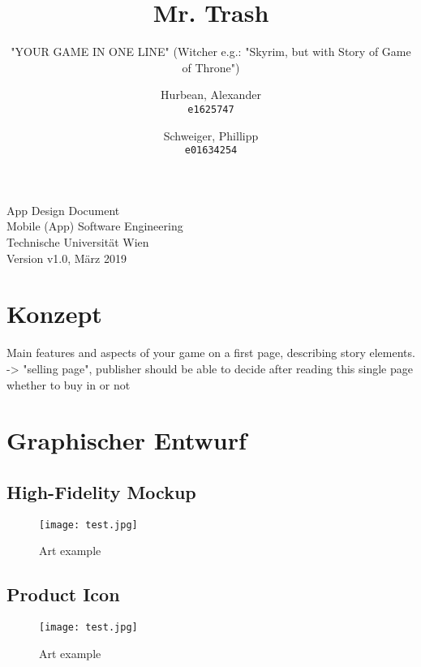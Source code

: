 \documentclass[a4paper]{scrreprt}
\title{Mr. Trash}
\subtitle{"YOUR GAME IN ONE LINE" (Witcher e.g.: "Skyrim, but with Story of Game of Throne")}
\author{
    Hurbean, Alexander\\
    \texttt{e1625747}
    \and
    Schweiger, Phillipp\\
    \texttt{e01634254}}
\begin{document}
\maketitle

\null\vfill
\noindent
App Design Document\\ 
Mobile (App) Software Engineering\\
Technische Universität Wien\\
Version v1.0, März 2019\\
\newpage


\tableofcontents

\chapter{Konzept}

Main features and aspects of your game on a first page, describing story elements. -> "selling page", publisher should be able to decide after reading this single page whether to buy in or not 


\chapter{Graphischer Entwurf} 

\section{High-Fidelity Mockup}
\begin{figure}
\centering
\texttt{[image: test.jpg]}
\caption{\label{fig:art1} Art example}
\end{figure}

\section{Product Icon}
\begin{figure}
\centering
\texttt{[image: test.jpg]}
\caption{\label{fig:art2} Art example}
\end{figure}



\end{document}
